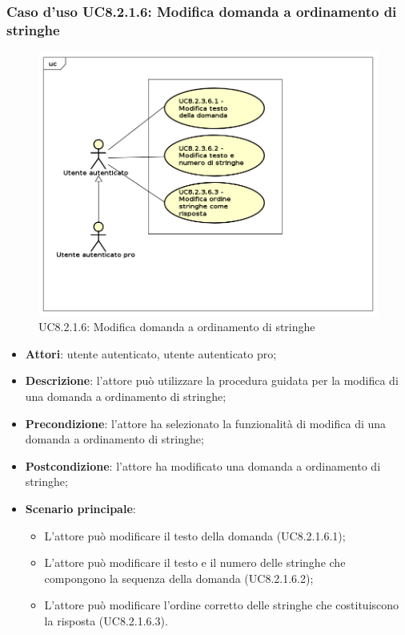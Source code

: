 \subsubsection{Caso d’uso UC8.2.1.6: Modifica domanda a ordinamento di stringhe}
	\label{UC8.2.1.6}
	\begin{figure}[h]
		\centering
		\includegraphics[scale=0.45,keepaspectratio]{UML/UC8_2_1_6.png}
		\caption{UC8.2.1.6: Modifica domanda a ordinamento di stringhe}
	\end{figure}
	\FloatBarrier
\begin{itemize}
	\item\textbf{Attori}: utente autenticato, utente autenticato pro;
	\item\textbf{Descrizione}: l'attore può utilizzare la procedura guidata per la modifica di una domanda a ordinamento di stringhe;
	\item\textbf{Precondizione}: l'attore ha selezionato la funzionalità di modifica di una domanda a ordinamento di stringhe;
	\item \textbf{Postcondizione}: l'attore ha modificato una domanda a ordinamento di stringhe;
	\item\textbf{Scenario principale}:
		\begin{itemize}
			\item L'attore può modificare il testo della domanda (UC8.2.1.6.1);
			\item L'attore può modificare il testo e il numero delle stringhe che compongono la sequenza della domanda (UC8.2.1.6.2);
			\item L'attore può modificare l'ordine corretto delle stringhe che costituiscono la risposta (UC8.2.1.6.3).
		\end{itemize}
\end{itemize}

